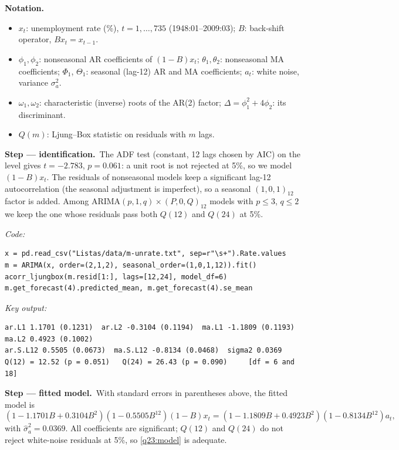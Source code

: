 \documentclass[11pt,a4paper]{article}
\newenvironment{notacao}{\par\smallskip\noindent\textbf{Notation.}\begin{itemize}[leftmargin=1.4em,topsep=1pt,itemsep=0pt]\small}{\end{itemize}}
\newcommand{\passo}[2]{\par\smallskip\noindent\textbf{Step --- #1.}~#2}
\begin{document}
\begin{sol}
\begin{notacao}
\item $x_t$: unemployment rate (\%), $t=1,\dots,735$ (1948:01--2009:03); $B$: back-shift operator, $Bx_t=x_{t-1}$.
\item $\phi_1,\phi_2$: nonseasonal AR coefficients of $(1-B)x_t$; $\theta_1,\theta_2$: nonseasonal MA coefficients;
$\Phi_1$, $\Theta_1$: seasonal (lag-12) AR and MA coefficients; $a_t$: white noise, variance $\sigma_a^2$.
\item $\omega_1,\omega_2$: characteristic (inverse) roots of the AR(2) factor; $\Delta=\phi_1^2+4\phi_2$: its discriminant.
\item $Q(m)$: Ljung--Box statistic on residuals with $m$ lags.
\end{notacao}

\passo{identification}{The ADF test (constant, 12 lags chosen by AIC) on the level gives $t=-2.783$,
$p=0.061$: a unit root is not rejected at 5\%, so we model $(1-B)x_t$. The residuals of nonseasonal models
keep a significant lag-12 autocorrelation (the seasonal adjustment is imperfect), so a seasonal $(1,0,1)_{12}$
factor is added. Among ARIMA$(p,1,q)\times(P,0,Q)_{12}$ models with $p\le 3$, $q\le 2$ we keep the one whose
residuals pass both $Q(12)$ and $Q(24)$ at 5\%.}

\noindent\textit{Code:}
\begingroup\footnotesize
\begin{verbatim}
x = pd.read_csv("Listas/data/m-unrate.txt", sep=r"\s+").Rate.values
m = ARIMA(x, order=(2,1,2), seasonal_order=(1,0,1,12)).fit()
acorr_ljungbox(m.resid[1:], lags=[12,24], model_df=6)
m.get_forecast(4).predicted_mean, m.get_forecast(4).se_mean
\end{verbatim}
\endgroup
\noindent\textit{Key output:}
\begingroup\footnotesize
\begin{verbatim}
ar.L1 1.1701 (0.1231)  ar.L2 -0.3104 (0.1194)  ma.L1 -1.1809 (0.1193)  ma.L2 0.4923 (0.1002)
ar.S.L12 0.5505 (0.0673)  ma.S.L12 -0.8134 (0.0468)  sigma2 0.0369
Q(12) = 12.52 (p = 0.051)   Q(24) = 26.43 (p = 0.090)     [df = 6 and 18]
\end{verbatim}
\endgroup

\passo{fitted model}{With standard errors in parentheses above, the fitted model is}
\begin{equation}\label{q23:model}
(1-1.1701B+0.3104B^2)(1-0.5505B^{12})(1-B)x_t=(1-1.1809B+0.4923B^2)(1-0.8134B^{12})a_t ,
\end{equation}
with $\hat\sigma_a^2=0.0369$.
All coefficients are significant; $Q(12)$ and $Q(24)$ do not reject white-noise residuals at 5\%, so
\eqref{q23:model} is adequate.


\end{sol}
\end{document}
